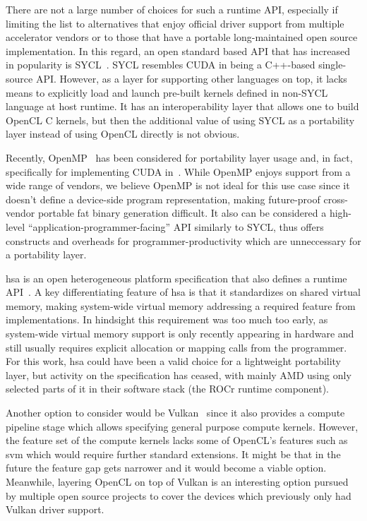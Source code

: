 \documentclass[Afour,sageh,times]{sagej}
\newcommand{\mycite}[1]{\citep{#1}}
\begin{document}
There are not a large number of choices for such a runtime API, especially
if limiting the list to alternatives that enjoy official driver support from
multiple accelerator vendors or to those that have a portable long-maintained open source implementation. In this regard, an open standard based API that has increased in popularity is SYCL~\mycite{SYCL}. SYCL
resembles CUDA in being a C++-based single-source API. However, as a layer for supporting other languages on top, it lacks means to explicitly load and launch pre-built kernels defined in non-SYCL language at host runtime. It has an interoperability layer that allows one to build OpenCL C kernels, but then the additional value of using SYCL as a portability layer instead of using OpenCL directly is not obvious.

Recently, OpenMP~\mycite{OpenMP} has been considered for portability layer usage and,
in fact, specifically for implementing CUDA in~\mycite{10.1145/3559009.3569687}.
While OpenMP enjoys support from a wide range of vendors,
we believe OpenMP is not ideal for this use case since it doesn't
define a device-side program representation, making future-proof cross-vendor portable fat binary generation difficult. It also can be considered
a high-level ``application-programmer-facing'' API similarly to SYCL,
thus offers constructs and overheads for programmer-productivity which are unneccessary for a portability layer.

\gls{hsa} is an open heterogeneous platform
specification that also defines a runtime API~\mycite{HSA,HSART}.
A key differentiating feature of \gls{hsa} is that it standardizes on shared virtual memory,
making system-wide virtual memory addressing a required feature from
implementations. In hindsight this requirement was too much
too early, as system-wide virtual memory support is only recently appearing
in hardware and still usually requires explicit allocation or mapping
calls from the programmer.
For this work, \gls{hsa} could have been a valid choice for
a lightweight portability layer, but activity on the specification has ceased,
with mainly AMD using only selected parts of it in their software stack (the ROCr runtime component).

Another option to consider would be Vulkan~\mycite{Vulkan} since it also
provides a compute pipeline stage which allows specifying general purpose compute
kernels. However, the
feature set of the compute kernels lacks some of OpenCL's features such as \gls{svm} which
would require further standard extensions.
It might be that in the future
the feature gap gets narrower and it would become a viable option. Meanwhile, layering OpenCL on top of Vulkan is an interesting option pursued by multiple open source projects to cover the devices which previously only had Vulkan driver support.
\end{document}
